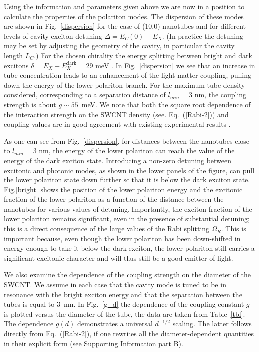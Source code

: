 \documentclass[journal=aamick,manuscript=article]{achemso}
\begin{document}
Using the information and parameters given above we are now in a position to calculate the properties of the polariton modes.
The dispersion of these modes are shown in Fig.~\ref{dispersion} for the case of (10,0) nanotubes and for different levels of cavity-exciton detuning $\Delta=E_C(0)-E_X$.
(In practice the detuning may be set by adjusting the geometry of the cavity, in particular the cavity length $L_C$.)
For the chosen chirality the energy splitting between bright and dark excitons $\delta=E_X-E_X^{\mathrm{dark}}=29$ meV \cite{Spataru2005}.
In Fig.~\ref{dispersion} we see that an increase in tube concentration leads to an enhancement of the light-matter coupling, pulling down the energy of the lower polariton branch. For the maximum tube density considered, corresponding to a separation distance of $l_{min}=3$ nm, the coupling strength is about $g \sim  55 $~meV.
We note that both the square root dependence of the interaction strength on the SWCNT density (see. Eq.~(\ref{Rabi-2})) and coupling values are in good agreement with existing experimental results \cite{Graf2016}.

As one can see from Fig.~\ref{dispersion}, for distances between the nanotubes close to $l_{min}=3$ nm, the energy of the lower polariton can reach the value of the energy of the dark exciton state.
Introducing a non-zero detuning between excitonic and photonic modes, as shown in the lower panels of the figure, can pull the lower polariton state down further so that it is below the dark exciton state.
Fig.\ref{bright} shows the position of the lower polariton energy and the excitonic fraction of the lower polariton as a function of the distance between the nanotubes for various values of detuning.
Importantly, the exciton fraction of the lower polariton remains significant, even in the presence of substantial detuning; this is a direct consequence of the large values of the Rabi splitting $\Omega_R$.
This is important because, even though the lower polariton has been down-shifted in energy enough to take it below the dark exciton, the lower polariton still carries a significant excitonic character and will thus still be a good emitter of light.

We also examine the dependence of the coupling strength on the diameter of the SWCNT.
We assume in each case that the cavity mode is tuned to be in resonance with the bright exciton energy and that the separation between the tubes is equal to $3$~nm.
In Fig.~\ref{g_d} the dependence of the coupling constant $g$ is plotted versus the diameter of the tube, the data are taken from Table~\ref{tbl}.
The dependence $g(d)$ demonstrates a universal $d^{-1/2}$ scaling. The latter follows directly from Eq.~(\ref{Rabi-2}), if one rewrites all the diameter-dependent quantities in their explicit form (see Supporting Information part B).
\end{document}
